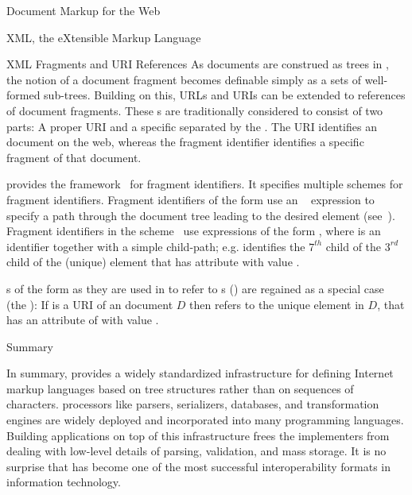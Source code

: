 \begin{omgroup}[id=markup-web]{Document Markup for the Web}
\begin{omgroup}[id=xml]{XML, the eXtensible Markup Language}
\begin{omgroup}[id=xml-fragments]{XML Fragments and URI References}
  As documents are construed as trees in {\xml}, the notion of a document fragment becomes
  definable simply as a sets of well-formed sub-trees. Building on this, URLs and URIs can
  be extended to references of document fragments. These {s} are
  traditionally considered to consist of two parts: A proper URI and a specific
  {} separated by the {}
  {\snippet{\#}}. The URI identifies an {\xml} document on the web, whereas the fragment
  identifier identifies a specific fragment of that document.

  {\xml} provides the {\xpointer} framework~\cite{GroMal:xf03} for fragment
  identifiers. It specifies multiple schemes for fragment identifiers. Fragment
  identifiers of the form {} use an
  {\xpath}~\cite{ClaDeR:xpath99} expression {} to specify a path
  through the document tree leading to the desired element (see~\cite{DeRMal:xxs02}).
  Fragment identifiers in the {} scheme~\cite{GroMal:xes03} use
  expressions of the form {}, where
  {} is an  identifier
  together with a simple child-path; e.g.  {} identifies the
  $7^{th}$ child of the $3^{rd}$ child of the (unique) element that has
  {} attribute with value {}.

  {s} of the form {} as they
  are used in {\html} to refer to {s} ({}) are regained as a special case (the
  ): If {} is a URI of an {\xml}
  document $D$ then {} refers to the unique element
  in $D$, that has an attribute of  with value {}.
\end{omgroup}

\begin{omgroup}[id=xml.summary]{Summary}

  In summary, {\xml} provides a widely standardized infrastructure for defining Internet
  markup languages based on tree structures rather than on sequences of characters. {\xml}
  processors like parsers, serializers, {\xml} databases, and {\xslt} transformation
  engines are widely deployed and incorporated into many programming languages. Building
  {\xml} applications on top of this infrastructure frees the implementers from dealing
  with low-level details of parsing, validation, and mass storage. It is no surprise that
  {\xml} has become one of the most successful interoperability formats in information
  technology.


\end{omgroup}
\end{omgroup}
\end{omgroup}
